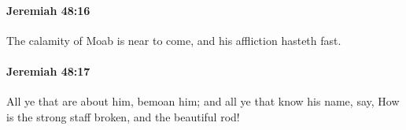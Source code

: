 		\paragraph{Jeremiah 48:16} %
			\label{JEREMIAH-48-16}

			The calamity of Moab is near to come, and his affliction hasteth fast.


		\paragraph{Jeremiah 48:17} %
			\label{JEREMIAH-48-17}

			All ye that are about him, bemoan him; and all ye that know his name, say, How is the strong staff broken, and the beautiful rod!


